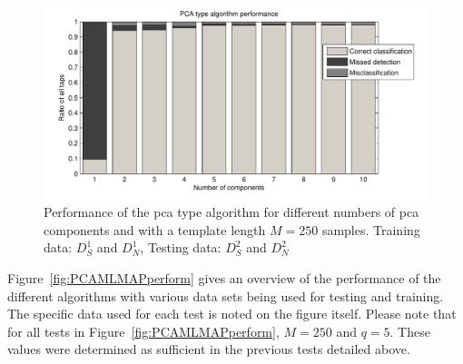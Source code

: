 \begin{figure}[!] %
\centering
\includegraphics[width=150mm]{PCAperform_SN-SN.pdf}
\caption{Performance of the \DIFdelbeginFL {}\DIFdelendFL \DIFaddbeginFL \gls{pca} \DIFaddendFL type algorithm for different numbers of \DIFdelbeginFL {}\DIFdelendFL \DIFaddbeginFL \gls{pca} \DIFaddendFL components and with a template length $M=250$ samples. Training data: $D^1_S$ and $D^1_N$, Testing data: $D^2_S$ and $D^2_N$}\label{fig:PCAperform_SN-SN}
\end{figure}

Figure~\ref{fig:PCAMLMAPperform} gives an overview of the performance of the different algorithms with various data sets being used for testing and training. The specific data used for each test is noted on the figure itself. Please note that for all tests in Figure~\ref{fig:PCAMLMAPperform}, $M=250$ and $q=5$. These values were determined as sufficient in the previous tests detailed above.\DIFaddbegin \
\DIFaddend

